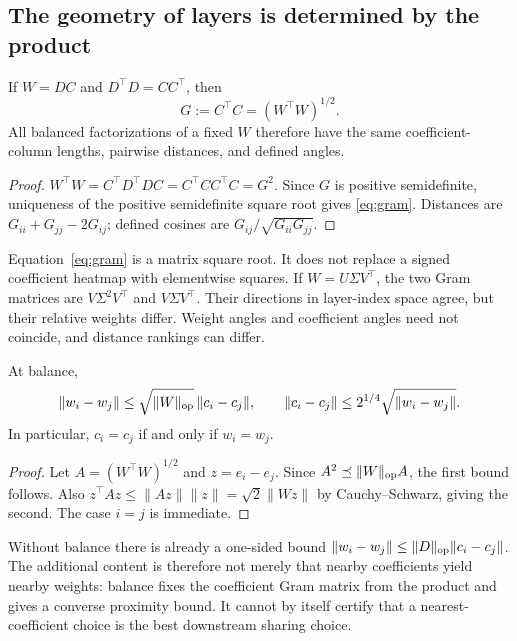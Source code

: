 \subsection{The geometry of layers is determined by the product}
\begin{proposition}\label{prop:gram}
If $W=DC$ and $D^\top D=CC^\top$, then
\begin{equation}\label{eq:gram}
 G:=C^\top C=(W^\top W)^{1/2}.
\end{equation}
All balanced factorizations of a fixed $W$ therefore have the same coefficient-column lengths, pairwise distances, and defined angles.
\end{proposition}
\begin{proof}
$W^\top W=C^\top D^\top DC=C^\top CC^\top C=G^2$.
Since $G$ is positive semidefinite, uniqueness of the positive semidefinite square root gives \eqref{eq:gram}. Distances are $G_{ii}+G_{jj}-2G_{ij}$; defined cosines are $G_{ij}/\sqrt{G_{ii}G_{jj}}$.
\end{proof}
Equation~\eqref{eq:gram} is a matrix square root. It does not replace a signed coefficient heatmap with elementwise squares. If $W=U\Sigma V^\top$, the two Gram matrices are $V\Sigma^2V^\top$ and $V\Sigma V^\top$. Their directions in layer-index space agree, but their relative weights differ. Weight angles and coefficient angles need not coincide, and distance rankings can differ.

\begin{corollary}
At balance,
\begin{equation}\label{eq:proximity}
 \|w_i-w_j\|\leq\sqrt{\|W\|_{\rm op}}\,\|c_i-c_j\|,
 \qquad
 \|c_i-c_j\|\leq2^{1/4}\sqrt{\|w_i-w_j\|}.
\end{equation}
In particular, $c_i=c_j$ if and only if $w_i=w_j$.
\end{corollary}
\begin{proof}
Let $A=(W^\top W)^{1/2}$ and $z=e_i-e_j$. Since $A^2\preceq\|W\|_{\rm op}A$, the first bound follows. Also $z^\top Az\leq\|Az\|\|z\|=\sqrt2\|Wz\|$ by Cauchy--Schwarz, giving the second. The case $i=j$ is immediate.
\end{proof}
Without balance there is already a one-sided bound $\|w_i-w_j\|\leq\|D\|_{\rm op}\|c_i-c_j\|$. The additional content is therefore not merely that nearby coefficients yield nearby weights: balance fixes the coefficient Gram matrix from the product and gives a converse proximity bound. It cannot by itself certify that a nearest-coefficient choice is the best downstream sharing choice.


